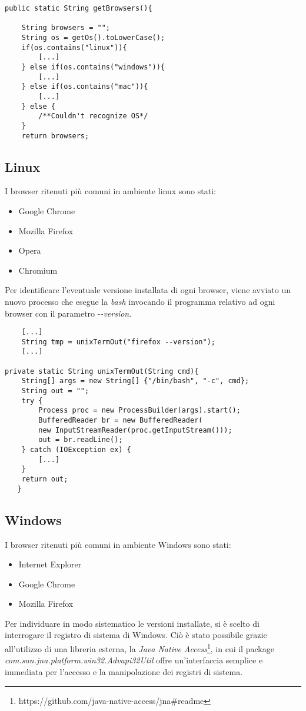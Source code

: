 \vspace{0.5cm}
\begin{lstlisting}
public static String getBrowsers(){

	String browsers = "";
	String os = getOs().toLowerCase();
	if(os.contains("linux")){
		[...]
	} else if(os.contains("windows")){
		[...]
	} else if(os.contains("mac")){
		[...]
	} else {
		/**Couldn't recognize OS*/
	}
	return browsers;
\end{lstlisting}

\subsection{Linux}
I browser ritenuti pi\`{u} comuni in ambiente linux sono stati:
\begin{itemize}
	\item Google Chrome
	\item Mozilla Firefox
	\item Opera
	\item Chromium
\end{itemize}
Per identificare l'eventuale versione installata di ogni browser, viene avviato un nuovo processo che esegue la \textit{bash} invocando il programma relativo ad ogni browser con il parametro -\textit{-version}.

\vspace{0.5cm}
\begin{lstlisting}
	[...]
	String tmp = unixTermOut("firefox --version");
	[...]

private static String unixTermOut(String cmd){
    String[] args = new String[] {"/bin/bash", "-c", cmd};
    String out = "";
    try {
	    Process proc = new ProcessBuilder(args).start();
	    BufferedReader br = new BufferedReader(
	    new InputStreamReader(proc.getInputStream()));
	    out = br.readLine();
    } catch (IOException ex) {
	    [...]
    }
    return out;
   }
\end{lstlisting}

\subsection{Windows}
I browser ritenuti pi\`{u} comuni in ambiente Windows sono stati:
\begin{itemize}
	\item Internet Explorer
	\item Google Chrome
	\item Mozilla Firefox
\end{itemize}
Per individuare in modo sistematico le versioni installate, si \`{e} scelto di interrogare il registro di sistema di Windows.
Ci\`{o} \`{e} stato possibile grazie all'utilizzo di una libreria esterna, la
\textit{Java Native Access}\footnote{https://github.com/java-native-access/jna\#readme}, in cui il package \textit{com.sun.jna.platform.win32.Advapi32Util} offre un'interfaccia semplice e immediata per l'accesso e la manipolazione dei registri di sistema.

